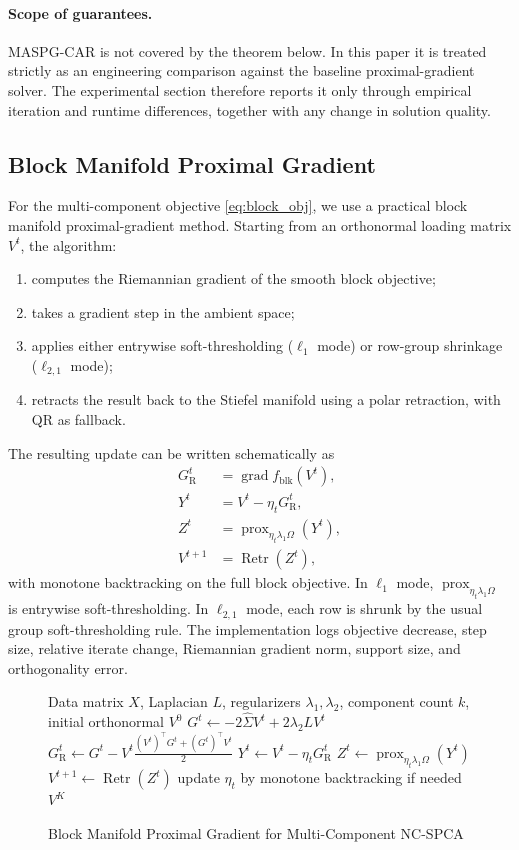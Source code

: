 \documentclass[10pt,twocolumn,letterpaper]{article}
\theoremstyle{definition}
\newcommand{\Sigmahat}{\widehat{\Sigma}}
\DeclareMathOperator{\prox}{prox}
\begin{document}
\paragraph{Scope of guarantees.}
MASPG-CAR is not covered by the theorem below. In this paper it is treated strictly as an engineering comparison against the baseline proximal-gradient solver. The experimental section therefore reports it only through empirical iteration and runtime differences, together with any change in solution quality.

\subsection{Block Manifold Proximal Gradient}
For the multi-component objective \eqref{eq:block_obj}, we use a practical block manifold proximal-gradient method. Starting from an orthonormal loading matrix $V^t$, the algorithm:
\begin{enumerate}[leftmargin=*]
\item computes the Riemannian gradient of the smooth block objective;
\item takes a gradient step in the ambient space;
\item applies either entrywise soft-thresholding ($\ell_1$ mode) or row-group shrinkage ($\ell_{2,1}$ mode);
\item retracts the result back to the Stiefel manifold using a polar retraction, with QR as fallback.
\end{enumerate}

The resulting update can be written schematically as
\begin{align}
G^t_{\mathrm{R}} &= \operatorname{grad} f_{\mathrm{blk}}(V^t), \\
Y^t &= V^t - \eta_t G^t_{\mathrm{R}}, \\
Z^t &= \prox_{\eta_t \lambda_1 \Omega}(Y^t), \\
V^{t+1} &= \operatorname{Retr}(Z^t),
\end{align}
with monotone backtracking on the full block objective. In $\ell_1$ mode, $\prox_{\eta_t \lambda_1 \Omega}$ is entrywise soft-thresholding. In $\ell_{2,1}$ mode, each row is shrunk by the usual group soft-thresholding rule. The implementation logs objective decrease, step size, relative iterate change, Riemannian gradient norm, support size, and orthogonality error.

\begin{figure}[t]
\centering
\caption{Block Manifold Proximal Gradient for Multi-Component NC-SPCA}
\label{alg:block_manpg}
\begin{algorithmic}[1]
\Require Data matrix $X$, Laplacian $L$, regularizers $\lambda_1,\lambda_2$, component count $k$, initial orthonormal $V^0$
  \State $G^t \gets -2\Sigmahat V^t + 2\lambda_2 L V^t$
  \State $G^t_{\mathrm{R}} \gets G^t - V^t \frac{(V^t)^\top G^t + (G^t)^\top V^t}{2}$
  \State $Y^t \gets V^t - \eta_t G^t_{\mathrm{R}}$
  \State $Z^t \gets \prox_{\eta_t \lambda_1 \Omega}(Y^t)$
  \State $V^{t+1} \gets \operatorname{Retr}(Z^t)$
  \State update $\eta_t$ by monotone backtracking if needed
\EndFor
\State \Return $V^K$
\end{algorithmic}
\end{figure}
\end{document}

